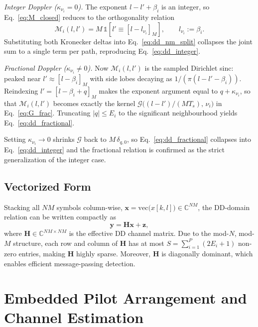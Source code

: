 \documentclass[11pt,a4paper]{article}
\begin{document}
\emph{Integer Doppler ($\kappa_{\nu_i}=0$).}
The exponent $l-l'+\beta_i$ is an integer, so
Eq.~\eqref{eq:M_closed} reduces to the orthogonality relation
\begin{equation}
  \mathcal{M}_i(l,l')
  = M\,\mathbb{1}\!\left[l'\equiv[l-l_{\nu_i}]_M\right],
  \qquad l_{\nu_i}:=\beta_i.
\end{equation}
Substituting both Kronecker deltas into
Eq.~\eqref{eq:dd_nm_split} collapses the joint sum to a single term
per path, reproducing Eq.~\eqref{eq:dd_integer}.

\emph{Fractional Doppler ($\kappa_{\nu_i}\ne 0$).}
Now $\mathcal{M}_i(l,l')$ is the sampled Dirichlet sinc: peaked
near $l'\approx[l-\beta_i]_M$ with side lobes decaying as
$1/(\pi(l-l'-\beta_i))$. Reindexing $l' = [l-\beta_i+q]_M$ makes
the exponent argument equal to $q+\kappa_{\nu_i}$, so that
$\mathcal{M}_i(l,l')$ becomes exactly the kernel
$\mathcal{G}\!\bigl((l-l')/(MT_s),\,\nu_i\bigr)$ in
Eq.~\eqref{eq:G_frac}. Truncating $|q|\le E_i$ to the significant
neighbourhood yields Eq.~\eqref{eq:dd_fractional}.

Setting $\kappa_{\nu_i}\to 0$ shrinks $\mathcal{G}$ back to
$M\,\delta_{q,0}$, so Eq.~\eqref{eq:dd_fractional} collapses into
Eq.~\eqref{eq:dd_integer} and the fractional relation is confirmed
as the strict generalization of the integer case.

\subsection{Vectorized Form}

Stacking all $NM$ symbols column-wise,
$\mathbf{x} = \mathrm{vec}\bigl(x[k,l]\bigr) \in \mathbb{C}^{NM}$,
the DD-domain relation can be written compactly as
\begin{equation}
  \mathbf{y} = \mathbf{H}\mathbf{x} + \mathbf{z},
  \label{eq:dd_vec}
\end{equation}
where $\mathbf{H}\in\mathbb{C}^{NM\times NM}$ is the effective DD
channel matrix. Due to the mod-$N$, mod-$M$ structure, each row and
column of $\mathbf{H}$ has at most $S = \sum_{i=1}^{P}(2E_i+1)$
non-zero entries, making $\mathbf{H}$ highly sparse. Moreover,
$\mathbf{H}$ is diagonally dominant, which enables efficient
message-passing detection.

\section{Embedded Pilot Arrangement and Channel Estimation}
\label{sec:pilot}
\end{document}
